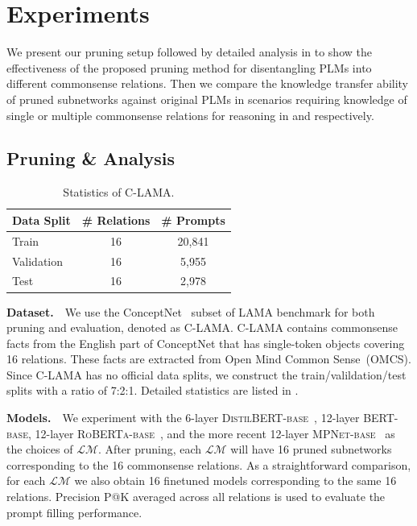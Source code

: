 
\section{Experiments}
We present our pruning setup followed by detailed analysis in  to show the effectiveness of the proposed pruning method for disentangling PLMs into different commonsense  relations. Then we compare the knowledge transfer ability of pruned subnetworks against original PLMs in scenarios requiring knowledge of single or multiple commonsense relations for reasoning in  and  respectively.

\subsection{Pruning \& Analysis}
\label{sec:LAMA}
\begin{table}[!h]
	\centering
	\small
	\begin{tabular}{l|cc}
		\toprule
		\textbf{Data Split} & \textbf{\# Relations} & \textbf{\# Prompts} \\
		\midrule
		Train  & 16 &  20,841\\
		Validation   & 16 &  5,955\\
		Test   & 16 &  2,978\\
		\bottomrule
	\end{tabular}
	\caption{Statistics of C-LAMA.}
	\label{table:conceptnet}
\end{table}
\noindent
\textbf{Dataset.}~~We use the ConceptNet~\citep{speer-havasi-2012-representing} subset of LAMA benchmark for both pruning and evaluation, denoted as C-LAMA.
C-LAMA contains commonsense facts from the English part of ConceptNet that has
single-token objects covering 16 relations. These facts are extracted from Open Mind Common Sense~(OMCS). Since C-LAMA has no official data splits, we construct the train/valildation/test splits with a ratio of 7:2:1. Detailed statistics are listed in . 


\noindent
\textbf{Models.}~~We experiment with the 6-layer \textsc{DistilBERT-base}~\citep{DBLP:journals/corr/abs-1910-01108}, 12-layer \textsc{BERT-base}, 12-layer \textsc{RoBERTa-base}~\citep{DBLP:journals/corr/abs-1907-11692}, and the more recent 12-layer \textsc{MPNet-base}~\citep{song2020mpnet} as the choices of $\mathcal{LM}$. After pruning, each $\mathcal{LM}$ will have 16 pruned subnetworks corresponding to the 16 commonsense relations. As a straightforward comparison, for each $\mathcal{LM}$ we also obtain 16 finetuned models corresponding to the same 16 relations. Precision P@K averaged across all relations is used to evaluate the prompt filling performance. 


